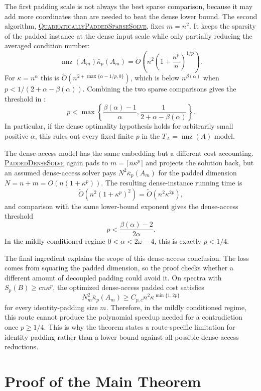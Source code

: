 \documentclass[11pt]{article}
\begin{document}
The first padding scale is not always the best sparse comparison, because it
may add more coordinates than are needed to beat the dense lower bound.  The
second algorithm,
\hyperref[alg:quadratically-padded-sparse-solve]{\textsc{QuadraticallyPaddedSparseSolve}},
fixes $m=n^2$.  It keeps the sparsity of the padded instance at the dense
input scale while only partially reducing the averaged condition number:
\[
  \operatorname{nnz}(A_m)\bar{\kappa}_p(A_m)
  =
  \widetilde{O}\left(
    n^2\left(1+\frac{\kappa^p}{n}\right)^{1/p}
  \right).
\]
For $\kappa=n^\alpha$ this is
$\widetilde{O}(n^{2+\max\{\alpha-1/p,0\}})$, which is below
$n^{\beta(\alpha)}$ when
$p<1/(2+\alpha-\beta(\alpha))$.  Combining the two sparse comparisons gives
the threshold in :
\[
  p<
  \max\left\{
    \frac{\beta(\alpha)-1}{\alpha},
    \frac{1}{2+\alpha-\beta(\alpha)}
  \right\}.
\]
In particular, if the dense optimality hypothesis holds for arbitrarily small
positive $\alpha$, this rules out every fixed finite $p$ in the
$T_A=\operatorname{nnz}(A)$ model.

The dense-access model has the same embedding but a different cost accounting.
\hyperref[alg:padded-dense-solve]{\textsc{PaddedDenseSolve}} again pads to
$m=\lceil n\kappa^p\rceil$ and projects the solution back, but an assumed
dense-access solver pays $N^2\bar{\kappa}_p(A_m)$ for the padded dimension
$N=n+m=O(n(1+\kappa^p))$.  The resulting dense-instance running time is
\[
  \widetilde{O}(n^2(1+\kappa^p)^2)
  =
  \widetilde{O}(n^2\kappa^{2p}),
\]
and comparison with the same lower-bound exponent gives the dense-access
threshold
\[
  p<\frac{\beta(\alpha)-2}{2\alpha}.
\]
In the mildly conditioned regime $0<\alpha<2\omega-4$, this is exactly
$p<1/4$.

The final ingredient explains the scope of this dense-access conclusion.  The
loss comes from squaring the padded dimension, so the proof checks whether a
different amount of decoupled padding could avoid it.  On spectra with
$S_p(B)\geq c n\kappa^p$, the optimized dense-access padded cost satisfies
\[
  N_m^2\bar{\kappa}_p(A_m)
  \geq
  C_{p,c} n^2\kappa^{\min\{1,2p\}}
\]
for every identity-padding size $m$.  Therefore, in the mildly conditioned
regime, this route cannot produce the polynomial speedup needed for a
contradiction once $p\geq1/4$.  This is why the theorem states a
route-specific limitation for identity padding rather than a lower bound
against all possible dense-access reductions.

\section{Proof of the Main Theorem}
\end{document}
